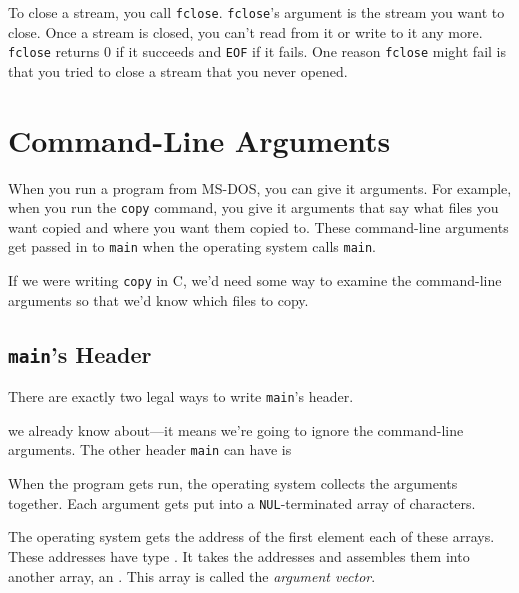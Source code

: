 To close a stream, you call {\tt fclose}.  {\tt fclose}'s argument is
the stream you want to close.  Once a stream is closed, you can't read
from it or write to it any more.  {\tt fclose} returns 0 if it succeeds
and {\tt EOF} if it fails.  One reason {\tt fclose} might fail is that
you tried to close a stream that you never opened.

\section{Command-Line Arguments}

When you run a program from MS-DOS, you can give it arguments.  For
example, when you run the {\tt copy} command, you  give it arguments
that say what files you want copied and where you want them copied to.
These command-line arguments get passed in to {\tt main} when the
operating system calls {\tt main}.

If we were writing {\tt copy} in C, we'd need some way to examine the
command-line arguments so that we'd know which files to copy.

\subsection{{\tt main}'s Header}

There are exactly two legal ways to write {\tt main}'s header. 

\begin{flushleft}
\verb% int main(void)% \\*
\end{flushleft}

\noindent we already know about---it means we're going to ignore the
command-line arguments.  The other header {\tt main} can have is

\begin{flushleft}
\verb% int main(int argc, char **argv)% \\*
\end{flushleft}

When the program gets run, the operating system collects the arguments
together.  Each argument gets put into a {\tt NUL}-terminated array of
characters.

The operating system gets the address of the first element each of these
arrays.  These addresses have type \Char.  It takes the addresses and
assembles them into another array, an .  This array
is called the {\em argument vector}\/.

